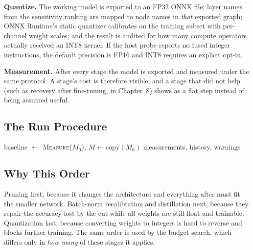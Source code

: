 \documentclass[oneside,a4paper,12pt]{report}
\newcommand{\code}[1]{\texttt{\small #1}}
\begin{document}
\textbf{Quantize.} The working model is exported to an FP32 ONNX file; layer names from the sensitivity ranking are mapped to node names in \emph{that} exported graph; ONNX Runtime's static quantizer calibrates on the training subset with per-channel weight scales; and the result is audited for how many compute operators actually received an INT8 kernel. If the host probe reports no fused integer instructions, the default precision is FP16 and INT8 requires an explicit opt-in.

\textbf{Measurement.} After every stage the model is exported and measured under the same protocol. A stage's cost is therefore visible, and a stage that did not help (such as recovery after fine-tuning, in Chapter~8) shows as a flat step instead of being assumed useful.

\subsection{The Run Procedure}
\begin{algorithm}[H]
\caption{\code{Pipeline.run}}\label{alg:run}
baseline $\gets$ \textsc{Measure}($M_0$); $M \gets \mathrm{copy}(M_0)$\;
\Return measurements, history, warnings\;
\end{algorithm}

\subsection{Why This Order}
Pruning first, because it changes the architecture and everything after must fit the smaller network. Batch-norm recalibration and distillation next, because they repair the accuracy lost by the cut while all weights are still float and trainable. Quantization last, because converting weights to integers is hard to reverse and blocks further training. The same order is used by the budget search, which differs only in \emph{how many} of these stages it applies.
\end{document}
